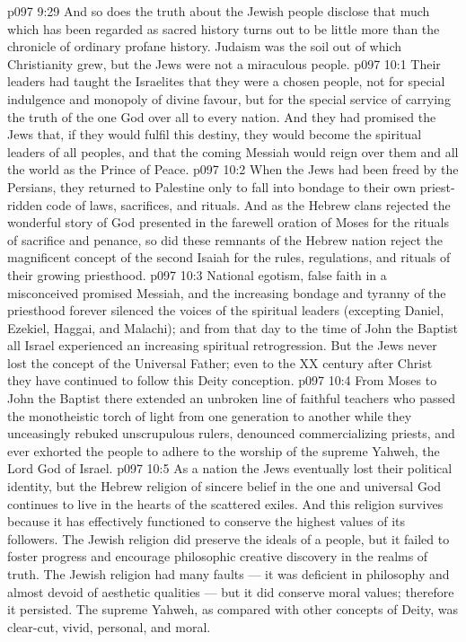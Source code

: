 \vs p097 9:29 \pc And so does the truth about the Jewish people disclose that much which has been regarded as sacred history turns out to be little more than the chronicle of ordinary profane history. Judaism was the soil out of which Christianity grew, but the Jews were not a miraculous people.
\vs p097 10:1 Their leaders had taught the Israelites that they were a chosen people, not for special indulgence and monopoly of divine favour, but for the special service of carrying the truth of the one God over all to every nation. And they had promised the Jews that, if they would fulfil this destiny, they would become the spiritual leaders of all peoples, and that the coming Messiah would reign over them and all the world as the Prince of Peace.
\vs p097 10:2 When the Jews had been freed by the Persians, they returned to Palestine only to fall into bondage to their own priest\hyp{}ridden code of laws, sacrifices, and rituals. And as the Hebrew clans rejected the wonderful story of God presented in the farewell oration of Moses for the rituals of sacrifice and penance, so did these remnants of the Hebrew nation reject the magnificent concept of the second Isaiah for the rules, regulations, and rituals of their growing priesthood.
\vs p097 10:3 National egotism, false faith in a misconceived promised Messiah, and the increasing bondage and tyranny of the priesthood forever silenced the voices of the spiritual leaders (excepting Daniel, Ezekiel, Haggai, and Malachi); and from that day to the time of John the Baptist all Israel experienced an increasing spiritual retrogression. But the Jews never lost the concept of the Universal Father; even to the XX century after Christ they have continued to follow this Deity conception.
\vs p097 10:4 From Moses to John the Baptist there extended an unbroken line of faithful teachers who passed the monotheistic torch of light from one generation to another while they unceasingly rebuked unscrupulous rulers, denounced commercializing priests, and ever exhorted the people to adhere to the worship of the supreme Yahweh, the Lord God of Israel.
\vs p097 10:5 \pc As a nation the Jews eventually lost their political identity, but the Hebrew religion of sincere belief in the one and universal God continues to live in the hearts of the scattered exiles. And this religion survives because it has effectively functioned to conserve the highest values of its followers. The Jewish religion did preserve the ideals of a people, but it failed to foster progress and encourage philosophic creative discovery in the realms of truth. The Jewish religion had many faults --- it was deficient in philosophy and almost devoid of aesthetic qualities --- but it did conserve moral values; therefore it persisted. The supreme Yahweh, as compared with other concepts of Deity, was clear\hyp{}cut, vivid, personal, and moral.
